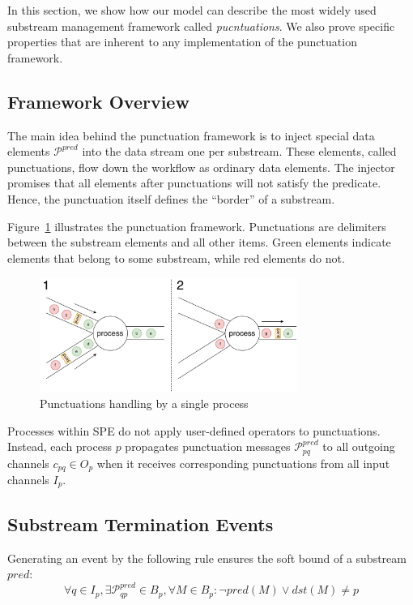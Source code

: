 In this section, we show how our model can describe the most widely used substream management framework called {\em pucntuations}. We also prove specific properties that are inherent to any implementation of the punctuation framework. 

\subsection{Framework Overview}

The main idea behind the punctuation framework is to inject special data elements $\mathcal{P}^{pred}$ into the data stream one per substream. These elements, called punctuations, flow down the workflow as ordinary data elements. The injector promises that all elements after punctuations will not satisfy the predicate. Hence, the punctuation itself defines the ``border'' of a substream.

Figure~\ref{punctuations_scheme} illustrates the punctuation framework. Punctuations are delimiters between the substream elements and all other items. Green elements indicate elements that belong to some substream, while red elements do not.

\begin{figure}[t]
  \centering
  \includegraphics[width=0.75\textwidth]{Chapters/SubstreamConsistency/pics/punctuations-scheme.pdf}
  \caption{Punctuations handling by a single process}
  \label{punctuations_scheme}
\end{figure}

Processes within SPE do not apply user-defined operators to punctuations. Instead, each process $p$ propagates punctuation messages $\mathcal{P}_{pq}^{pred}$ to all outgoing channels $c_{pq} \in O_p$  when it receives corresponding punctuations from all input channels $I_p$.

\subsection{Substream Termination Events}

\begin{lemma}
Generating an event by the following rule ensures the soft bound of a substream $pred$:
\begin{equation}
\forall q \in I_p, \exists \mathcal{P}^{pred}_{qp} \in B_p, \forall M\in B_p : \neg pred(M) \vee dst(M) \ne p
\end{equation}
\end{lemma}

